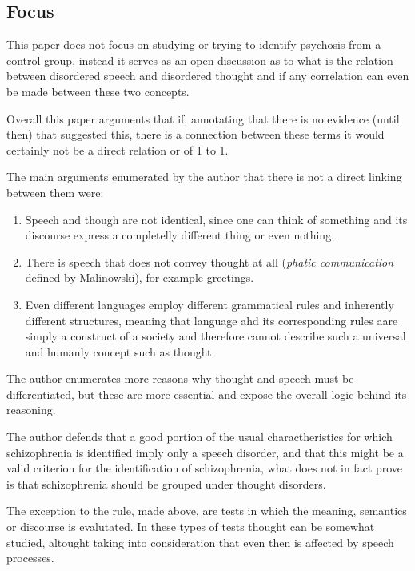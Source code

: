 \documentclass{Paper_Summary}
\begin{document}
\makepapertitle

\breakline

\begin{center}
    \section*{Focus}
\end{center}
    This paper does not focus on studying or trying to identify psychosis from a control group, instead it serves as an open discussion as to what is the relation between disordered speech and disordered thought and if any correlation can even be made between these two concepts.

    Overall this paper arguments that if, annotating that there is no evidence (until then) that suggested this, there is a connection between these terms it would certainly not be a direct relation or of 1 to 1.

    The main arguments enumerated by the author that there is not a direct linking between them were:
    \begin{enumerate}
        \item Speech and though are not identical, since one can think of something and its discourse express a completelly different thing or even nothing.
        \item There is speech that does not convey thought at all (\emph{phatic communication} defined by Malinowski), for example greetings.
        \item Even different languages employ different grammatical rules and inherently different structures, meaning that language ahd its corresponding rules aare simply a construct of a society and therefore cannot describe such a universal and humanly concept such as thought.
    \end{enumerate}
    The author enumerates more reasons why thought and speech must be differentiated, but these are more essential and expose the overall logic behind its reasoning.

    The author defends that a good portion of the usual charactheristics for which schizophrenia is identified imply only a speech disorder, and that this might be a valid criterion for the identification of schizophrenia, what does not in fact prove is that schizophrenia should be grouped under thought disorders.
    
    The exception to the rule, made above, are tests in which the meaning, semantics or discourse is evalutated. In these types of tests thought can be somewhat studied, altought taking into consideration that even then is affected by speech processes.
\end{document}
